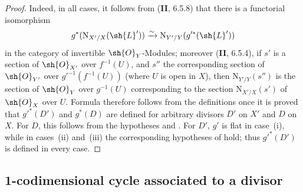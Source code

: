 \begin{proof}
Indeed, in all cases, it follows from (\textbf{II}, 6.5.8) that there is a functorial isomorphism
\[
  g^*(\mathrm{N}_{X'/X}(\sh{L}'))\xrightarrow{\sim}\mathrm{N}_{Y'/Y}(g'^*(\sh{L}'))
\]
in the category of invertible $\sh{O}_Y$-Modules;
moreover (\textbf{II}, 6.5.4), if $s'$ is a section of $\sh{O}_{X'}$ over $f^{-1}(U)$, and $s''$ the corresponding section of $\sh{O}_{Y'}$ over $g'^{-1}(f^{-1}(U))$ (where $U$ is open in $X$), then $\mathrm{N}_{Y'/Y}(s'')$ is the section of $\sh{O}_Y$ over $g^{-1}(U)$ corresponding to the section $\mathrm{N}_{X'/X}(s')$ of $\sh{O}_X$ over $U$.
Formula  therefore follows from the definitions once it is proved that $g'^*(D')$ and $g^*(D)$ are defined for arbitrary divisors $D'$ on $X'$ and $D$ on $X$.
For $D$, this follows from the hypotheses and .
For $D'$, $g'$ is flat in case~(i), while in cases~(ii) and~(iii) the corresponding hypotheses of  hold;
thus $g'^*(D')$ is defined in every case.
\end{proof}
\subsection{1-codimensional cycle associated to a divisor}
\label{subsection:IV.21.6}
\label{IV.21.6}


